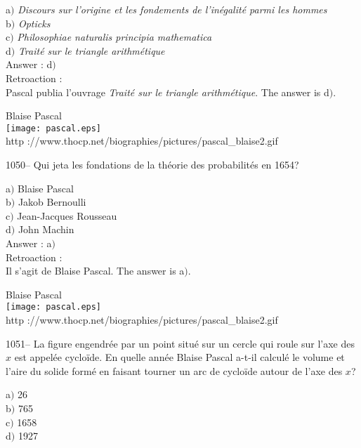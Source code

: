 ﻿\documentclass[letterpaper, 12pt]{article}
\begin{document}
a$)$ {\sl Discours sur l'origine et les fondements de l'in\'egalit\'e parmi
les hommes} \\
b$)$ {\sl Opticks}  \\
c$)$ {\sl Philosophiae naturalis principia mathematica}  \\
d$)$ {\sl Trait\'e sur le triangle arithm\'etique}\\

Answer : d$)$\\

Retroaction : \\
Pascal publia l'ouvrage {\sl Trait\'e sur le triangle
arithm\'etique}.
The answer is d$)$.\\

        \begin{center}
        Blaise Pascal\\
    \texttt{[image: pascal.eps]}\\
        {\footnotesize http
://www.thocp.net/biographies/pictures/pascal\_blaise2.gif}
    \end{center}

1050-- Qui jeta les fondations de la th\'eorie des probabilit\'es en
1654?

a$)$ Blaise Pascal \\
b$)$ Jakob Bernoulli  \\
c$)$ Jean-Jacques Rousseau \\
d$)$ John Machin\\

Answer : a$)$\\

Retroaction : \\
Il s'agit de Blaise Pascal.
The answer is a$)$.\\

        \begin{center}
        Blaise Pascal\\
    \texttt{[image: pascal.eps]}\\
        {\footnotesize http
://www.thocp.net/biographies/pictures/pascal\_blaise2.gif}
    \end{center}

1051-- La figure engendr\'ee par un point situ\'e sur un cercle qui
roule sur l'axe des $x$ est appel\'ee cyclo\"ide. En quelle ann\'ee
Blaise Pascal a-t-il calcul\'e le volume et l'aire du solide form\'e
en faisant tourner un arc de cyclo\"ide autour de l'axe des $x$?

a$)$ 26 \\
b$)$ 765  \\
c$)$ 1658  \\
d$)$ 1927\\
\end{document}
